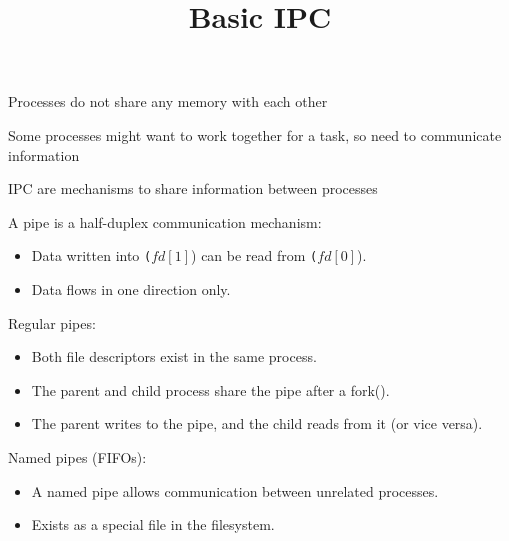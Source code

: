 

\title{Basic IPC}



  \begin{frame}
    \titlepage
  \end{frame}

\begin{slide}


    Processes do not share any memory with each other
    \bigskip

    Some processes might want to work together for a task, so need to communicate information
    \bigskip
    
    IPC are mechanisms to share information between processes

\end{slide}

\begin{slide}


\end{slide}

\begin{slide}

    
    \vspace{-3mm}
    
    A pipe is a {half-duplex} communication mechanism:
    \begin{itemize}
        \item Data written into \texttt($fd[1]$) can be read from \texttt($fd[0]$).
        \item Data flows in one direction only.
    \end{itemize}
    \bigskip
    
    Regular pipes:
    \begin{itemize}
        \item Both file descriptors exist in the {same process}.
        \item The parent and child process {share the pipe} after a {fork()}.
        \item The {parent writes} to the pipe, and the {child reads} from it (or vice versa).
    \end{itemize}
    \bigskip
    
    Named pipes (FIFOs):
    \begin{itemize}
        \item A named pipe allows communication between {unrelated processes}.
        \item Exists as a {special file} in the filesystem.
    \end{itemize}

\end{slide}

